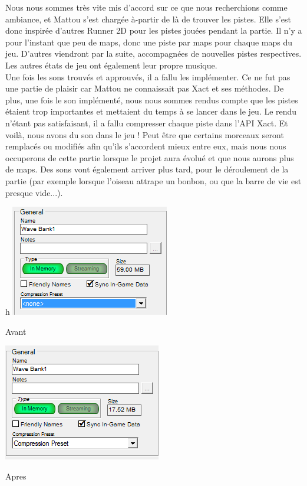 \documentclass [11pt]{report}
\begin{document}
	\indent Nous nous sommes très vite mis d'accord sur ce que nous recherchions comme ambiance, et Mattou s'est chargée à-partir de là  de trouver les pistes. Elle s'est donc inspirée d'autres Runner 2D pour les pistes jouées pendant la partie. Il n'y a pour l'instant que peu de maps, donc une piste par maps pour chaque maps du jeu. D'autres viendront par la suite, accompagnées de nouvelles pistes respectives. Les autres états de jeu ont également leur propre musique. \\
	
	
	\indent Une fois les sons trouvés et approuvés, il a fallu les implémenter. Ce ne fut pas une partie de plaisir car Mattou ne connaissait pas Xact et ses méthodes. De plus, une fois le son implémenté, nous nous sommes rendus compte que les pistes étaient trop importantes et mettaient du temps à se lancer dans le jeu. Le rendu n'étant pas satisfaisant, il a fallu compresser chaque piste dans l'API Xact. Et voilà, nous avons du son dans le jeu ! Peut être que certains morceaux seront remplacés ou modifiés afin qu'ils s'accordent mieux entre eux, mais nous nous occuperons de cette partie lorsque le projet aura évolué et que nous aurons plus de maps. Des sons vont  également arriver plus tard, pour le déroulement de la partie (par exemple lorsque l'oiseau attrape un bonbon, ou que la barre de vie est presque vide...).

		\vspace{8mm}
		
		\begin{minipage}[c]{.45\linewidth}
		\begin{center}h
		\includegraphics[scale=1]{images/compress-avant.png}
		\caption{Avant}
		\label{fig:image1}
		\end{center}
		\end{minipage}
		\hfill
		\begin{minipage}[c]{.45\linewidth}
		\begin{center}
		\includegraphics[scale=1]{images/compress-apres.png}
		\caption{Apres}
		\label{fig:image2}
		\end{center}
		\end{minipage}
	
\end{document}
